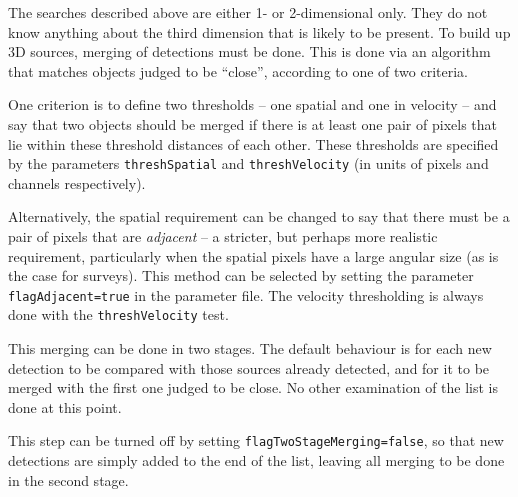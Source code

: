 %

\label{sec-merger}


The searches described above are either 1- or 2-dimensional only. They
do not know anything about the third dimension that is likely to be
present. To build up 3D sources, merging of detections must be
done. This is done via an algorithm that matches objects judged to be
``close'', according to one of two criteria.

One criterion is to define two thresholds -- one spatial and one in
velocity -- and say that two objects should be merged if there is at
least one pair of pixels that lie within these threshold distances of
each other. These thresholds are specified by the parameters
\texttt{threshSpatial} and \texttt{threshVelocity} (in units of pixels
and channels respectively).

Alternatively, the spatial requirement can be changed to say that
there must be a pair of pixels that are \emph{adjacent} -- a stricter,
but perhaps more realistic requirement, particularly when the spatial
pixels have a large angular size (as is the case for \hi
surveys). This method can be selected by setting the parameter
\texttt{flagAdjacent=true} in the parameter file. The velocity
thresholding is always done with the \texttt{threshVelocity} test. 



This merging can be done in two stages. The default behaviour is for
each new detection to be compared with those sources already detected,
and for it to be merged with the first one judged to be close. No
other examination of the list is done at this point.

This step can be turned off by setting
\texttt{flagTwoStageMerging=false}, so that new detections are simply
added to the end of the list, leaving all merging to be done in the
second stage.

